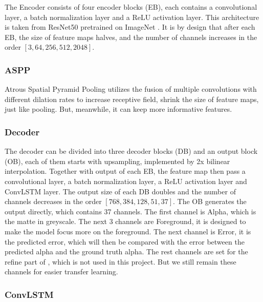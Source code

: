 \documentclass[final]{cvpr}
\begin{document}
The Encoder consists of four encoder blocks (EB), each contains a convolutional layer, a batch normalization layer and a ReLU activation layer.
This architecture is taken from ResNet50 pretrained on ImageNet \cite{imagenet_cvpr09}.
It is by design that after each EB, the size of feature maps halves, and the number of channels increases in the order $[3, 64, 256, 512, 2048]$.

\subsubsection{ASPP}

Atrous Spatial Pyramid Pooling utilizes the fusion of multiple convolutions with different dilation rates to increase receptive field, shrink the size of feature maps, just like pooling.
But, meanwhile, it can keep more informative features.

\subsubsection{Decoder}

The decoder can be divided into three decoder blocks (DB) and an output block (OB), each of them starts with upsampling, implemented by 2x bilinear interpolation.
Together with output of each EB, the feature map then pass a convolutional layer, a batch normalization layer, a ReLU activation layer and ConvLSTM layer.
The output size of each DB doubles and the number of channels decreases in the order  $[768, 384, 128, 51, 37]$.
The OB generates the output directly, which contains 37 channels.
The first channel is Alpha, which is the matte in greyscale.
The next 3 channels are Foreground, it is designed to make the model focus more on the foreground.
The next channel is Error, it is the predicted error, which will then be compared with the error between the predicted alpha and the ground truth alpha.
The rest channels are set for the refine part of \cite{linRealTimeHighResolutionBackground2020a}, which is not used in this project.
But we still remain these channels for easier transfer learning.

\subsubsection{ConvLSTM}
\end{document}
